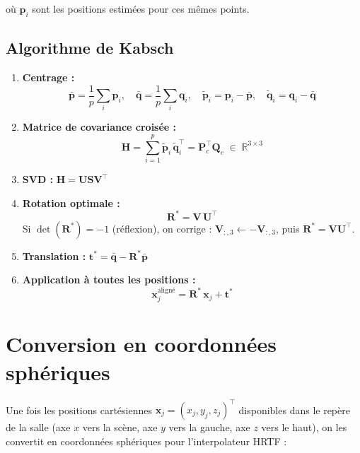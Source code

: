\documentclass[12pt, a4paper]{article}
\theoremstyle{plain}
\theoremstyle{definition}
\newcommand{\R}{\mathbb{R}}
\newcommand{\mat}[1]{\mathbf{#1}}
\newcommand{\vect}[1]{\mathbf{#1}}
\begin{document}
où $\vect{p}_i$ sont les positions estimées pour ces mêmes points.

\subsection{Algorithme de Kabsch}

\begin{enumerate}
    \item \textbf{Centrage :}
    \[
        \bar{\vect{p}} = \frac{1}{p}\sum_i\vect{p}_i, \quad
        \bar{\vect{q}} = \frac{1}{p}\sum_i\vect{q}_i, \quad
        \tilde{\vect{p}}_i = \vect{p}_i - \bar{\vect{p}}, \quad
        \tilde{\vect{q}}_i = \vect{q}_i - \bar{\vect{q}}
    \]

    \item \textbf{Matrice de covariance croisée :}
    \[
        \mat{H} = \sum_{i=1}^p \tilde{\vect{p}}_i\,\tilde{\vect{q}}_i^\top
        = \mat{P}_c^\top\mat{Q}_c \;\in\; \R^{3\times 3}
    \]

    \item \textbf{SVD :} $\mat{H} = \mat{U}\mat{S}\mat{V}^\top$

    \item \textbf{Rotation optimale :}
    \[
        \mat{R}^* = \mat{V}\,\mat{U}^\top
    \]
    Si $\det(\mat{R}^*) = -1$ (réflexion), on corrige :
    $\mat{V}_{:,3} \leftarrow -\mat{V}_{:,3}$, puis $\mat{R}^* = \mat{V}\mat{U}^\top$.

    \item \textbf{Translation :} $\vect{t}^* = \bar{\vect{q}} - \mat{R}^*\bar{\vect{p}}$

    \item \textbf{Application à toutes les positions :}
    \[
        \vect{x}_j^{\text{aligné}} = \mat{R}^*\,\vect{x}_j + \vect{t}^*
    \]
\end{enumerate}

\section{Conversion en coordonnées sphériques}

Une fois les positions cartésiennes $\vect{x}_j = (x_j, y_j, z_j)^\top$
disponibles dans le repère de la salle (axe $x$ vers la scène, axe $y$ vers
la gauche, axe $z$ vers le haut), on les convertit en coordonnées sphériques
pour l'interpolateur HRTF :
\end{document}
